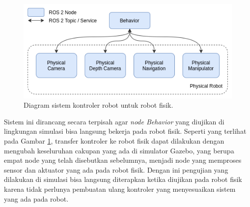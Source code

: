 \begin{figure} [ht] \centering
  \includegraphics[scale=0.45]{gambar/kontrolerfisik.png}
  \caption{Diagram sistem kontroler robot untuk robot fisik.}
  \label{fig:kontrolerfisik}
\end{figure}

Sistem ini dirancang secara terpisah agar \emph{node Behavior} yang diujikan di lingkungan simulasi bisa langsung bekerja pada robot fisik.
Seperti yang terlihat pada Gambar \ref{fig:kontrolerfisik}, transfer kontroler ke robot fisik dapat dilakukan dengan mengubah keseluruhan cakupan yang ada di simulator Gazebo, yang berupa empat node yang telah disebutkan sebelumnya, menjadi node yang memproses sensor dan aktuator yang ada pada robot fisik.
Dengan ini pengujian yang dilakukan di simulasi bisa langsung diterapkan ketika diujikan pada robot fisik karena tidak perlunya pembuatan ulang kontroler yang menyesuaikan sistem yang ada pada robot.
